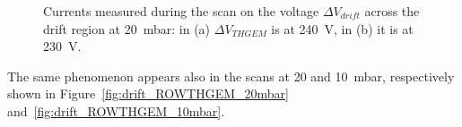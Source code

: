 \documentclass[a4paper, 11 pt]{article}
\newcommand{\Vthgem}{$\Delta V_{THGEM}$}
\newcommand{\Vdrift}{$ \Delta V_{drift}$}
\begin{document}
\begin{figure}[!htb]
	\centering
	\caption{Currents measured during the scan on the voltage \Vdrift{} across the drift region at 20~mbar: in (a) \Vthgem{} is at 240~V, in (b) it is at 230~V.}
	\label{fig:drift_ROWTHGEM_30mbar_both}
\end{figure}

The same phenomenon appears also in the scans at 20 and 10~mbar, respectively shown in Figure~\ref{fig:drift_ROWTHGEM_20mbar} and~\ref{fig:drift_ROWTHGEM_10mbar}.
\end{document}
